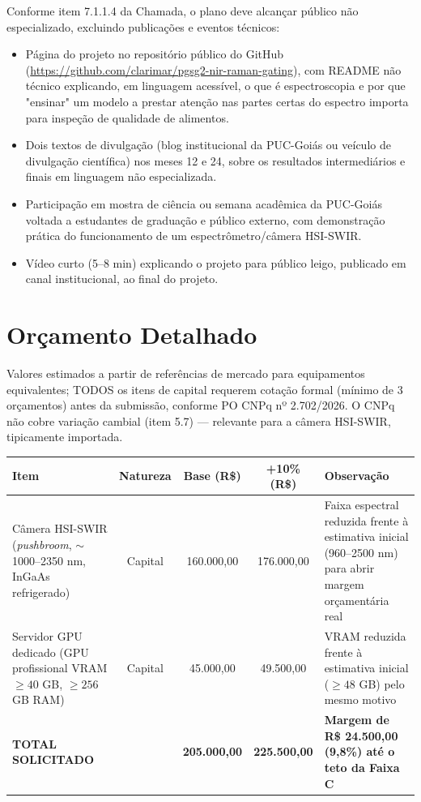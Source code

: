 \documentclass[11pt,a4paper]{article}
\begin{document}
Conforme item 7.1.1.4 da Chamada, o plano deve alcançar público não especializado, excluindo publicações e eventos técnicos:
\begin{itemize}
\item Página do projeto no repositório público do GitHub (\url{https://github.com/clarimar/pgsg2-nir-raman-gating}), com README não técnico explicando, em linguagem acessível, o que é espectroscopia e por que "ensinar" um modelo a prestar atenção nas partes certas do espectro importa para inspeção de qualidade de alimentos.
\item Dois textos de divulgação (blog institucional da PUC-Goiás ou veículo de divulgação científica) nos meses 12 e 24, sobre os resultados intermediários e finais em linguagem não especializada.
\item Participação em mostra de ciência ou semana acadêmica da PUC-Goiás voltada a estudantes de graduação e público externo, com demonstração prática do funcionamento de um espectrômetro/câmera HSI-SWIR.
\item Vídeo curto (5--8 min) explicando o projeto para público leigo, publicado em canal institucional, ao final do projeto.
\end{itemize}

\section{Orçamento Detalhado}
\label{sec:orcamento}

Valores estimados a partir de referências de mercado para equipamentos equivalentes; TODOS os itens de capital requerem cotação formal (mínimo de 3 orçamentos) antes da submissão, conforme PO CNPq nº 2.702/2026. O CNPq não cobre variação cambial (item 5.7) --- relevante para a câmera HSI-SWIR, tipicamente importada.

\begin{center}
\begin{tabular}{p{4.3cm}cccp{3.2cm}}
\toprule
Item & Natureza & Base (R\$) & +10\% (R\$) & Observação \\
\midrule
Câmera HSI-SWIR (\emph{pushbroom}, $\sim$1000--2350 nm, InGaAs refrigerado) & Capital & 160.000,00 & 176.000,00 & Faixa espectral reduzida frente à estimativa inicial (960--2500 nm) para abrir margem orçamentária real \\
Servidor GPU dedicado (GPU profissional VRAM $\geq 40$ GB, $\geq 256$ GB RAM) & Capital & 45.000,00 & 49.500,00 & VRAM reduzida frente à estimativa inicial ($\geq 48$ GB) pelo mesmo motivo \\
\midrule
\textbf{TOTAL SOLICITADO} & & \textbf{205.000,00} & \textbf{225.500,00} & \textbf{Margem de R\$ 24.500,00 (9,8\%) até o teto da Faixa C} \\
\bottomrule
\end{tabular}
\end{center}
\end{document}

